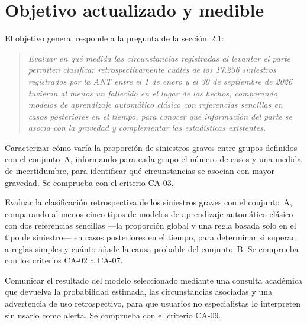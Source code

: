 \section{Objetivo actualizado y medible}

El objetivo general responde a la pregunta de la sección~2.1:

\begin{quote}
\emph{Evaluar en qué medida las circunstancias registradas al levantar el parte permiten clasificar retrospectivamente cuáles de los 17.236 siniestros registrados por la ANT entre el 1 de enero y el 30 de septiembre de 2026 tuvieron al menos un fallecido en el lugar de los hechos, comparando modelos de aprendizaje automático clásico con referencias sencillas en casos posteriores en el tiempo, para conocer qué información del parte se asocia con la gravedad y complementar las estadísticas existentes.}
\end{quote}

\begin{description}[leftmargin=1.6em,style=nextline]
\item[OE1. Caracterizar la variabilidad de la gravedad.] Caracterizar cómo varía la proporción de siniestros graves entre grupos definidos con el conjunto~A, informando para cada grupo el número de casos y una medida de incertidumbre, para identificar qué circunstancias se asocian con mayor gravedad. Se comprueba con el criterio CA-03.

\item[OE2. Evaluar la clasificación.] Evaluar la clasificación retrospectiva de los siniestros graves con el conjunto~A, comparando al menos cinco tipos de modelos de aprendizaje automático clásico con dos referencias sencillas ---la proporción global y una regla basada solo en el tipo de siniestro--- en casos posteriores en el tiempo, para determinar si superan a reglas simples y cuánto añade la causa probable del conjunto~B. Se comprueba con los criterios CA-02 a CA-07.

\item[OE3. Comunicar el resultado.] Comunicar el resultado del modelo seleccionado mediante una consulta académica que devuelva la probabilidad estimada, las circunstancias asociadas y una advertencia de uso retrospectivo, para que usuarios no especialistas lo interpreten sin usarlo como alerta. Se comprueba con el criterio CA-09.
\end{description}
